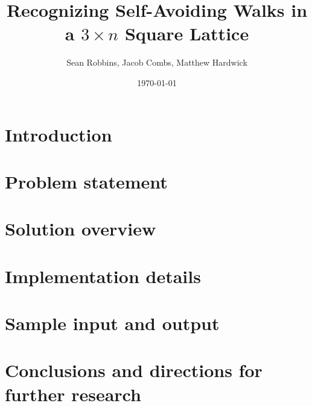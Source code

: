 \documentclass[11pt]{article} %
\title{Recognizing Self-Avoiding Walks in a $3\times n$ Square Lattice}
\author{Sean Robbins, Jacob Combs, Matthew Hardwick}
\date{\today}
\begin{document}
\maketitle
\tableofcontents

\section{Introduction}


\section{Problem statement}


\section{Solution overview}


\section{Implementation details}


\section{Sample input and output}


\section{Conclusions and directions for further research}




\end{document}
